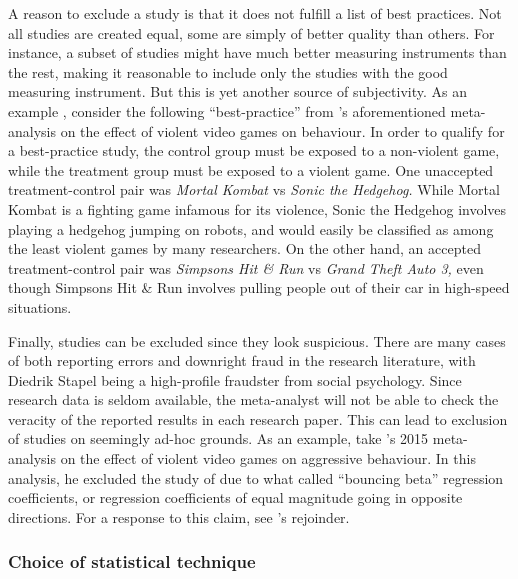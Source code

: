A reason to exclude a study is that it does not fulfill a list of
best practices. Not all studies are created equal, some are simply
of better quality than others. For instance, a subset of studies might
have much better measuring instruments than the rest, making it reasonable
to include only the studies with the good measuring instrument. But
this is yet another source of subjectivity. As an example \parencite[taken from][p. 6]{lakens_reproducibility_2016},
consider the following ``best-practice'' from \cite{Anderson2010-ki}'s
aforementioned meta-analysis on the effect of violent video games
on behaviour. In order to qualify for a best-practice study, the control
group must be exposed to a non-violent game, while the treatment group
must be exposed to a violent game. One unaccepted treatment-control
pair was \emph{Mortal Kombat} vs \emph{Sonic the Hedgehog.} While
Mortal Kombat is a fighting game infamous for its violence, Sonic
the Hedgehog involves playing a hedgehog jumping on robots, and would
easily be classified as among the least violent games by many researchers.
On the other hand, an accepted treatment-control pair was \emph{Simpsons
Hit \& Run }vs \emph{Grand Theft Auto 3, }even though Simpsons Hit
\& Run involves pulling people out of their car in high-speed situations. 

Finally, studies can be excluded since they look suspicious. There
are many cases of both reporting errors \parencite{nuijten_prevalence_2016}
and downright fraud in the research literature, with Diedrik Stapel
being a high-profile fraudster from social psychology. Since research
data is seldom available, the meta-analyst will not be able to check
the veracity of the reported results in each research paper. This
can lead to exclusion of studies on seemingly ad-hoc grounds. As an
example, take \citeauthor{ferguson_angry_2015}'s 2015 meta-analysis
on the effect of violent video games on aggressive behaviour. In this
analysis, he excluded the study of \cite{gentile_effects_2009} due
to what \cite{ferguson_angry_2015} called ``bouncing beta'' regression
coefficients, or regression coefficients of equal magnitude going
in opposite directions. For a response to this claim, see \cite{gentile_what_2015}'s
rejoinder.

\subsubsection{Choice of statistical technique}

